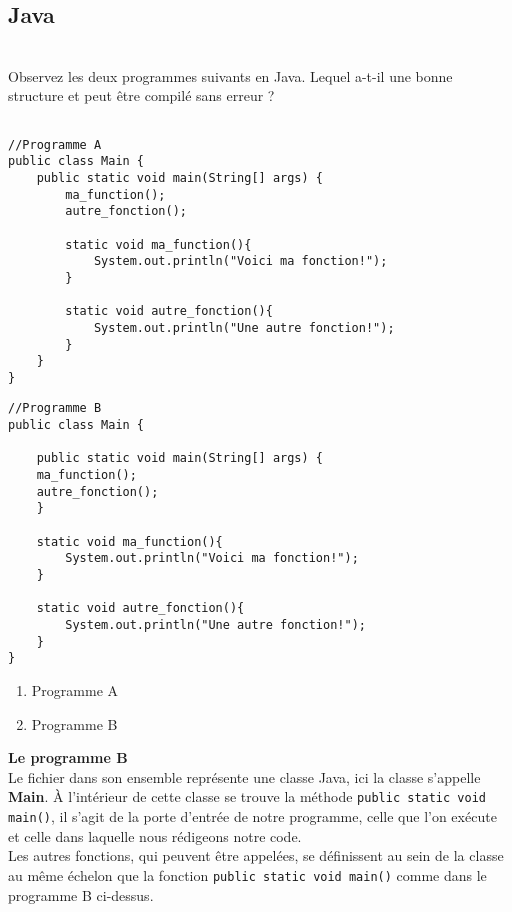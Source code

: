 \subsection{Java}


\begin{Exercice}[3 minutes] \\
Observez les deux programmes suivants en Java. Lequel a-t-il une bonne structure et peut être compilé sans erreur ?

\begin{multicols}{2}
\begin{lstlisting}

//Programme A
public class Main {
    public static void main(String[] args) {
        ma_function();
        autre_fonction();

        static void ma_function(){
            System.out.println("Voici ma fonction!");
        }
    
        static void autre_fonction(){
            System.out.println("Une autre fonction!");
        }
    }
}

\end{lstlisting}
\columnbreak

\begin{lstlisting}
//Programme B
public class Main {

    public static void main(String[] args) {
    ma_function();
    autre_fonction();
    }

    static void ma_function(){
        System.out.println("Voici ma fonction!");
    }

    static void autre_fonction(){
        System.out.println("Une autre fonction!");
    }
}
\end{lstlisting}
\columnbreak

\end{multicols}
\begin{enumerate}
    \item Programme A
    \item Programme B
\end{enumerate}
\begin{solution}
    \textbf{Le programme B}\\
    Le fichier dans son ensemble représente une classe Java, ici la classe s'appelle \textbf{Main}. À l'intérieur de cette classe se trouve la méthode \lstinline{public static void main()}, il s'agit de la porte d'entrée de notre programme, celle que l'on exécute et celle dans laquelle nous rédigeons notre code.\\
    Les autres fonctions, qui peuvent être appelées, se définissent au sein de la classe au même échelon que la fonction \lstinline{public static void main()} comme dans le programme B ci-dessus. 
\end{solution}
\end{Exercice}

